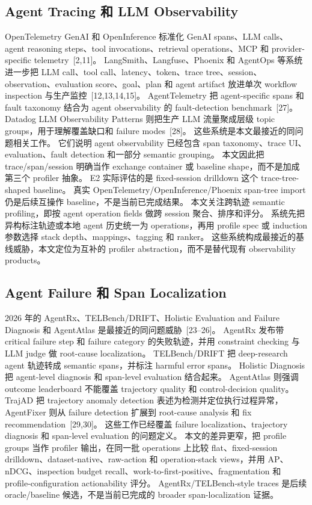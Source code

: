 \documentclass[10pt,twocolumn]{ctexart}
\begin{document}
\subsection{Agent Tracing 和 LLM Observability}
OpenTelemetry GenAI 和 OpenInference 标准化 GenAI spans、LLM calls、agent reasoning steps、tool invocations、retrieval operations、MCP 和 provider-specific telemetry~[2,11]。
LangSmith、Langfuse、Phoenix 和 AgentOps 等系统进一步把 LLM call、tool call、latency、token、trace tree、session、observation、evaluation score、goal、plan 和 agent artifact 放进单次 workflow inspection 与生产监控~[12,13,14,15]。
AgentTelemetry 把 agent-specific spans 和 fault taxonomy 结合为 agent observability 的 fault-detection benchmark~[27]。
Datadog LLM Observability Patterns 则把生产 LLM 流量聚成层级 topic groups，用于理解覆盖缺口和 failure modes~[28]。
这些系统是本文最接近的同问题相关工作。
它们说明 agent observability 已经包含 span taxonomy、trace UI、evaluation、fault detection 和一部分 semantic grouping。
本文因此把 trace/span/session 明确当作 exchange container 或 baseline shape，而不是加成第三个 profiler 抽象。
E2 实际评估的是 fixed-session drilldown 这个 trace-tree-shaped baseline。
真实 OpenTelemetry/OpenInference/Phoenix span-tree import 仍是后续互操作 baseline，不是当前已完成结果。
本文关注跨轨迹 semantic profiling，即按 agent operation fields 做跨 session 聚合、排序和评分。
系统先把异构标注轨迹或本地 agent 历史统一为 operations，再用 profile spec 或 induction 参数选择 stack depth、mappings、tagging 和 ranker。
这些系统构成最接近的基线威胁，本文定位为互补的 profiler abstraction，而不是替代现有 observability products。

\subsection{Agent Failure 和 Span Localization}
2026 年的 AgentRx、TELBench/DRIFT、Holistic Evaluation and Failure Diagnosis 和 AgentAtlas 是最接近的同问题威胁~[23--26]。
AgentRx 发布带 critical failure step 和 failure category 的失败轨迹，并用 constraint checking 与 LLM judge 做 root-cause localization。
TELBench/DRIFT 把 deep-research agent 轨迹转成 semantic spans，并标注 harmful error spans。
Holistic Diagnosis 把 agent-level diagnosis 和 span-level evaluation 结合起来。
AgentAtlas 则强调 outcome leaderboard 不能覆盖 trajectory quality 和 control-decision quality。
TrajAD 把 trajectory anomaly detection 表述为检测并定位执行过程异常，AgentFixer 则从 failure detection 扩展到 root-cause analysis 和 fix recommendation~[29,30]。
这些工作已经覆盖 failure localization、trajectory diagnosis 和 span-level evaluation 的问题定义。
本文的差异更窄，把 profile groups 当作 profiler 输出，在同一批 operations 上比较 flat、fixed-session drilldown、dataset-native、raw-action 和 operation-stack views，并用 AP、nDCG、inspection budget recall、work-to-first-positive、fragmentation 和 profile-configuration actionability 评分。
AgentRx/TELBench-style traces 是后续 oracle/baseline 候选，不是当前已完成的 broader span-localization 证据。
\end{document}
